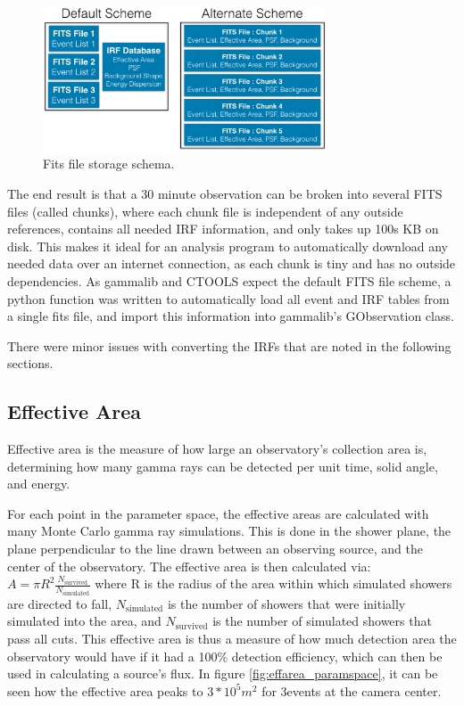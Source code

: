   \begin{figure}[ht]
    \centering
    \includegraphics[width=0.75\textwidth]{images/FITS_diagrams_alternate_scheme.eps}
    \caption[FITS File Event Storage Schemes]
    {Fits file storage schema.}
    \label{fig:fits_scheme}
  \end{figure}

  The end result is that a 30 minute observation can be broken into several FITS files (called chunks), where each chunk file is independent of any outside references, contains all needed IRF information, and only takes up \nicetilde100s KB on disk.
  This makes it ideal for an analysis program to automatically download any needed data over an internet connection, as each chunk is tiny and has no outside dependencies.
  As gammalib and CTOOLS expect the default FITS file scheme, a python function was written to automatically load all event and IRF tables from a single fits file, and import this information into gammalib's GObservation class.

  There were minor issues with converting the IRFs that are noted in the following sections.


  \subsection{Effective Area}\label{subsec:effarea}
    Effective area is the measure of how large an observatory's collection area is, determining how many gamma rays can be detected per unit time, solid angle, and energy.

    For each point in the parameter space, the effective areas are calculated with many Monte Carlo gamma ray simulations.
    This is done in the shower plane, the plane perpendicular to the line drawn between an observing source, and the center of the observatory.
    The effective area is then calculated via:
    $A=\pi R^2 \frac{N_{\text{survived}}}{N_{\text{simulated}}}$
    where R is the radius of the area within which simulated showers are directed to fall, $N_{\text{simulated}}$ is the number of showers that were initially simulated into the area, and $N_{\text{survived}}$ is the number of simulated showers that pass all cuts.
    This effective area is thus a measure of how much detection area the observatory would have if it had a 100\% detection efficiency, which can then be used in calculating a source's flux.
    In figure \ref{fig:effarea_paramspace}, it can be seen how the effective area peaks to \nicetilde$3*10^5 m^2$ for 3\TeV events at the camera center.

